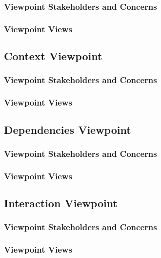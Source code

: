 \documentclass[onecolumn, draftclsnofoot,10pt, compsoc]{IEEEtran}
\newcounter{subsubsubsection}[subsubsection]
\begin{document}
        \subsubsection{Viewpoint Stakeholders and Concerns}
        \subsubsection{Viewpoint Views}
        
        \subsection{Context Viewpoint}
        \subsubsection{Viewpoint Stakeholders and Concerns}
        \subsubsection{Viewpoint Views}
           
        \subsection{Dependencies Viewpoint}
        \subsubsection{Viewpoint Stakeholders and Concerns}
        \subsubsection{Viewpoint Views}
        
        
        \subsection{Interaction Viewpoint}
        \subsubsection{Viewpoint Stakeholders and Concerns}
        \subsubsection{Viewpoint Views}
        
\end{document}
